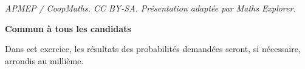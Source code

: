 \documentclass[10pt]{article}
\begin{document}
\noindent\textit{APMEP / CoopMaths. CC BY-SA. Présentation adaptée par Maths Explorer.}\par\medskip
\textbf{Commun à tous les candidats}

\medskip

Dans cet exercice, les résultats des probabilités demandées seront, si nécessaire, arrondis au millième.


























\medskip
\end{document}

